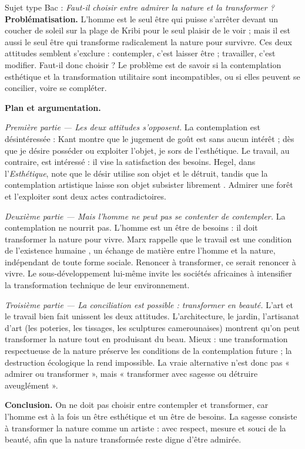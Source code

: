\documentclass[11pt]{article}
\begin{document}
\begin{exoresolu}
Sujet type Bac : \emph{Faut-il choisir entre admirer la nature et la transformer ?}
\tcblower
\textbf{Problématisation.} L'homme est le seul être qui puisse s'arrêter devant un coucher de soleil sur la plage de Kribi pour le seul plaisir de le voir ; mais il est aussi le seul être qui transforme radicalement la nature pour survivre. Ces deux attitudes semblent s'exclure : contempler, c'est laisser être ; travailler, c'est modifier. Faut-il donc choisir ? Le problème est de savoir si la contemplation esthétique et la transformation utilitaire sont incompatibles, ou si elles peuvent se concilier, voire se compléter.

\textbf{Plan et argumentation.}

\emph{Première partie — Les deux attitudes s'opposent.} La contemplation est désintéressée : Kant montre que le jugement de goût est \guillemotleft sans aucun intérêt \guillemotright ; dès que je désire posséder ou exploiter l'objet, je sors de l'esthétique. Le travail, au contraire, est intéressé : il vise la satisfaction des besoins. Hegel, dans l'\emph{Esthétique}, note que le désir \guillemotleft utilise \guillemotright son objet et le détruit, tandis que la contemplation artistique \guillemotleft laisse son objet subsister librement \guillemotright. Admirer une forêt et l'exploiter sont deux actes contradictoires.

\emph{Deuxième partie — Mais l'homme ne peut pas se contenter de contempler.} La contemplation ne nourrit pas. L'homme est un être de besoins : il doit transformer la nature pour vivre. Marx rappelle que le travail est \guillemotleft une condition de l'existence humaine \guillemotright, un échange de matière entre l'homme et la nature, indépendant de toute forme sociale. Renoncer à transformer, ce serait renoncer à vivre. Le sous-développement lui-même invite les sociétés africaines à intensifier la transformation technique de leur environnement.

\emph{Troisième partie — La conciliation est possible : transformer en beauté.} L'art et le travail bien fait unissent les deux attitudes. L'architecture, le jardin, l'artisanat d'art (les poteries, les tissages, les sculptures camerounaises) montrent qu'on peut transformer la nature tout en produisant du beau. Mieux : une transformation respectueuse de la nature préserve les conditions de la contemplation future ; la destruction écologique la rend impossible. La vraie alternative n'est donc pas « admirer ou transformer », mais « transformer avec sagesse ou détruire aveuglément ».

\textbf{Conclusion.} On ne doit pas choisir entre contempler et transformer, car l'homme est à la fois un être esthétique et un être de besoins. La sagesse consiste à transformer la nature comme un artiste : avec respect, mesure et souci de la beauté, afin que la nature transformée reste digne d'être admirée.
\end{exoresolu}
\end{document}
